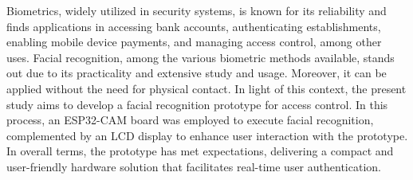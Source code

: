 
\begin{abstractutfpr}%
	Biometrics, widely utilized in security systems, is known for its 
	reliability and finds applications in accessing bank accounts, 
	authenticating establishments, enabling mobile device payments, 
	and managing access control, among other uses. Facial recognition, 
	among the various biometric methods available, stands out due to 
	its practicality and extensive study and usage. Moreover, it can be 
	applied without the need for physical contact. In light of this 
	context, the present study aims to develop a facial recognition 
	prototype for access control. In this process, an ESP32-CAM board 
	was employed to execute facial recognition, complemented by an LCD 
	display to enhance user interaction with the prototype. In overall 
	terms, the prototype has met expectations, delivering a compact 
	and user-friendly hardware solution that facilitates real-time user 
	authentication.
\end{abstractutfpr}
